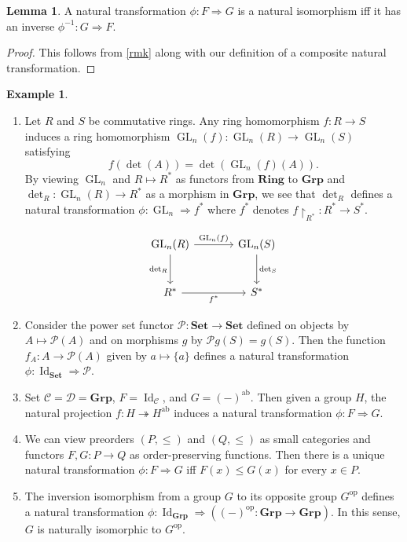 \documentclass[10pt,letterpaper,cm]{nupset}
\theoremstyle{definition}
\newtheorem{exmp}[definition]{Example}
\theoremstyle{theorem}
\newtheorem{lemma}[definition]{Lemma}
\theoremstyle{remark}
\renewcommand{\P}{\mathcal P}
\newcommand{\1}{\mathbf{1}}
\renewcommand{\c}{\mathscr{C}}
\renewcommand{\d}{\mathscr{D}}
\newcommand{\0}{\vec 0}
\DeclareMathOperator*{\GL}{GL}
\DeclareMathOperator{\id}{Id}
\DeclareMathOperator{\op}{op}
\DeclareMathOperator{\ab}{ab}
\begin{document}
\begin{lemma}
A natural transformation $\phi: F \Rightarrow G$ is a natural isomorphism iff it has an inverse $\phi^{{-1}} : G \Rightarrow F$.
\end{lemma}
\begin{proof}
This follows from \cref{rmk} along with our definition of a composite natural transformation.
\end{proof}

\begin{exmp} $ $
\begin{enumerate}
\item Let $R$ and $S$ be commutative rings. Any ring homomorphism $f: R \to S$ induces a ring homomorphism $\GL_n(f): \GL_n(R) \to \GL_n(S)$ satisfying $$f(\det(A)) = \det\left(\GL_n(f)(A)\right).$$ By viewing $\GL_n$ and $R \mapsto R^{\ast}$ as functors from $\mathbf{Ring}$ to $\mathbf{Grp}$ and $\det_R : \GL_n(R) \to R^{\ast}$ as a morphism in $\mathbf{Grp}$, we see that $\det_R$ defines a natural transformation $\phi : \GL_n \Rightarrow f^{\ast}$ where $f^{\ast}$ denotes $f\restriction_{R^{\ast}} :R^{\ast} \to S^{\ast}$.  

\[
\begin{tikzcd}[row sep=large, column sep = large]
\GL_n(R) \arrow[r, "\GL_n(f)"] \arrow[d, "\det_R", swap]
& \GL_n(S) \arrow[d, "\det_S"] \\
R^{\ast} \arrow[r, "f^{\ast}"']
& S^{\ast}
\end{tikzcd}
\]
\item Consider the power set functor $\P: \mathbf{Set} \to \mathbf{Set}$ defined  on objects  by $A \mapsto \P(A)$ and on morphisms $g$  by $\P{g}(S) = g(S)$. Then the function $f_A: A \to \P(A)$ given by $a \mapsto \{a\}$ defines a natural transformation $\phi: \id_{\mathbf{Set}} \Rightarrow \P$.
\item 
Set $\c = \d = \mathbf{Grp}$, $F= \id_{\c}$, and $G =(-)^{\ab}$. Then given a group $H$, the natural projection $f: H \twoheadrightarrow H^{\ab}$ induces a natural transformation $\phi: F \Rightarrow G$.
\item 
We can view preorders $\left(P, \leq\right)$ and $\left(Q, \leq\right)$ as small categories and functors $F, G: P \to Q$ as order-preserving functions. Then there is a unique natural transformation $\phi: F \Rightarrow G$ iff $F(x) \leq G(x)$ for every $x\in P$.
\item 
The inversion isomorphism from a group $G$ to its opposite group $G^{\op}$ defines a natural transformation $\phi: \id_{\mathbf{Grp}} \Rightarrow \left((-)^{\op}: \mathbf{Grp} \to \mathbf{Grp}\right)$. In this sense, $G$ is naturally isomorphic to $G^{\op}$.
\end{enumerate}
\end{exmp}
\end{document}
